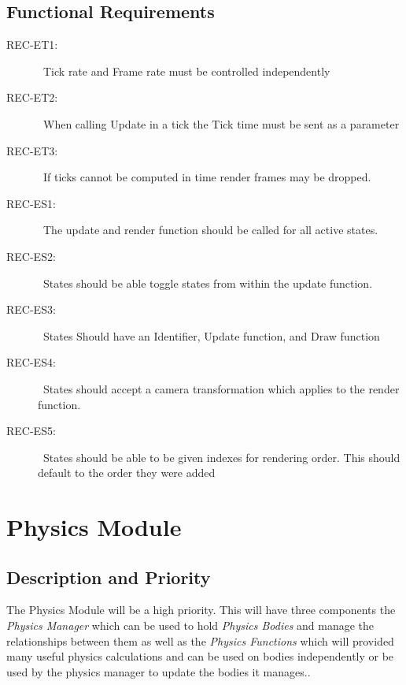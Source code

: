 \documentclass{scrreprt}
\begin{document}
	

\subsection{Functional Requirements}

\begin{description}
\item [{REC-ET1:}]~Tick rate and Frame rate must be controlled independently
\item [{REC-ET2:}]~When calling Update in a tick the Tick time must be sent as a parameter
\item [{REC-ET3:}]~If ticks cannot be computed in time render frames may be dropped.
\item [{REC-ES1:}]~The update and render function should be called for all active states.
\item [{REC-ES2:}]~States should be able toggle states from within the update function.
\item [{REC-ES3:}]~States Should have an Identifier, Update function, and Draw function
\item [{REC-ES4:}]~States should accept a camera transformation which applies to the render function.
\item [{REC-ES5:}]~States should be able to be given indexes for rendering order.  This should default to the order they were added

\end{description}


\section{Physics Module}

\subsection{Description and Priority}
The Physics Module will be a high priority. This will have three components the \textit{Physics Manager} which can be used to hold \textit{Physics Bodies} and manage the relationships between them as well as the \textit{Physics Functions} which will provided many useful physics calculations and can be used on bodies independently or be used by the physics manager to update the bodies it manages..
\end{document}
